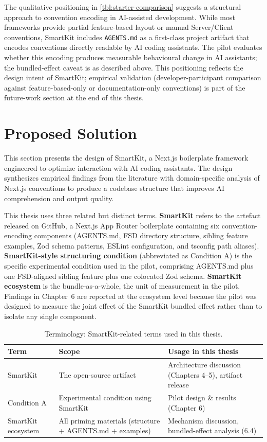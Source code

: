 \documentclass[12pt,a4paper]{report}
\DeclareRobustCommand{\filename}[1]{\bgroup\urlstyle{tt}\nolinkurl{#1}\egroup}
\begin{document}
The qualitative positioning in \autoref{tbl:starter-comparison} suggests a structural approach to convention encoding in AI-assisted development. While most frameworks provide partial feature-based layout or manual Server/Client conventions, SmartKit includes \filename{AGENTS.md} as a first-class project artifact that encodes conventions directly readable by AI coding assistants. The pilot evaluates whether this encoding produces measurable behavioural change in AI assistants; the bundled-effect caveat is as described above. This positioning reflects the design intent of SmartKit; empirical validation (developer-participant comparison against feature-based-only or documentation-only conventions) is part of the future-work section at the end of this thesis.

\chapter{Proposed Solution}
\label{sec:solution}

This section presents the design of SmartKit, a Next.js boilerplate framework engineered to optimize interaction with AI coding assistants. The design synthesizes empirical findings from the literature with domain-specific analysis of Next.js conventions to produce a codebase structure that improves AI comprehension and output quality.

This thesis uses three related but distinct terms. \textbf{SmartKit} refers to the artefact released on GitHub, a Next.js App Router boilerplate containing six convention-encoding components (AGENTS.md, FSD directory structure, sibling feature examples, Zod schema patterns, ESLint configuration, and tsconfig path aliases). \textbf{SmartKit-style structuring condition} (abbreviated as Condition A) is the specific experimental condition used in the pilot, comprising AGENTS.md plus one FSD-aligned sibling feature plus one colocated Zod schema. \textbf{SmartKit ecosystem} is the bundle-as-a-whole, the unit of measurement in the pilot. Findings in Chapter~6 are reported at the ecosystem level because the pilot was designed to measure the joint effect of the SmartKit bundled effect rather than to isolate any single component.

\begin{table}[H]
\centering
\caption{Terminology: SmartKit-related terms used in this thesis.}
\label{tab:smartkit-glossary}
\small
\begin{tabular}{@{}llp{7cm}@{}}
\toprule
\textbf{Term} & \textbf{Scope} & \textbf{Usage in this thesis} \\
\midrule
SmartKit & The open-source artifact & Architecture discussion (Chapters 4--5), artifact release \\
Condition A & Experimental condition using SmartKit & Pilot design \& results (Chapter 6) \\
SmartKit ecosystem & All priming materials (structure + AGENTS.md + examples) & Mechanism discussion, bundled-effect analysis (6.4) \\
\bottomrule
\end{tabular}
\normalsize
\end{table}
\end{document}

